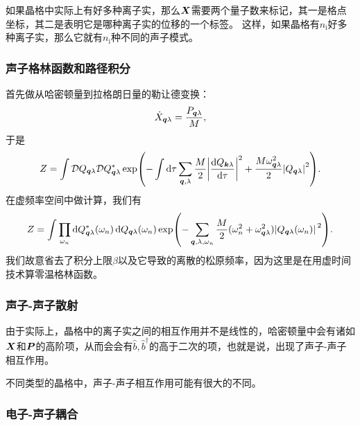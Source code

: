 \documentclass[hyperref, UTF8, a4paper]{ctexart}
\begin{document}
如果晶格中实际上有好多种离子实，那么$\vb*{X}$需要两个量子数来标记，其一是格点坐标，其二是表明它是哪种离子实的位移的一个标签。
这样，如果晶格有$n_\text{i}$好多种离子实，那么它就有$n_\text{i}$种不同的声子模式。

\subsubsection{声子格林函数和路径积分}

首先做从哈密顿量到拉格朗日量的勒让德变换：
\[
    \dot{X}_{\vb*{q} \lambda} = \frac{P_{\vb*{q} \lambda}}{M},
\]
于是
\begin{equation}
    Z = \int \mathcal{D} Q_{\vb*{q} \lambda} \mathcal{D} Q^*_{\vb*{q} \lambda} \exp(- \int \dd{\tau} \sum_{\vb*{q}, \lambda} \frac{M}{2} \abs{\dv{Q_{\vb*{k} \lambda}}{\tau}}^2 + \frac{M \omega_{\vb*{q} \lambda}^2}{2} \abs{Q_{\vb*{q} \lambda}}^2 ).
\end{equation}
在虚频率空间中做计算，我们有
\begin{equation}
    Z = \int \prod_{\omega_n} \dd{Q_{\vb*{q} \lambda}^*(\omega_n)} \dd{Q_{\vb*{q} \lambda}(\omega_n)} \exp(- \sum_{\vb*{q}, \lambda, \omega_n} \frac{M}{2} (\omega_n^2 + \omega_{\vb*{q} \lambda}^2) \abs*{Q_{\vb*{q} \lambda}(\omega_n)}^2).
\end{equation}
我们故意省去了积分上限$\beta$以及它导致的离散的松原频率，因为这里是在用虚时间技术算零温格林函数。

\subsubsection{声子-声子散射}

由于实际上，晶格中的离子实之间的相互作用并不是线性的，哈密顿量中会有诸如$\vb*{X}$和$\vb*{P}$的高阶项，从而会会有$\hat{b}, \hat{b}^\dagger$的高于二次的项，也就是说，出现了声子-声子相互作用。

不同类型的晶格中，声子-声子相互作用可能有很大的不同。

\subsubsection{电子-声子耦合}
\end{document}
